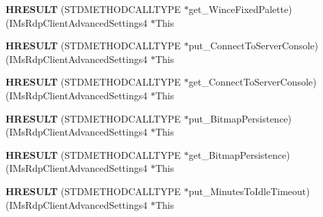 \begin{DoxyCompactItemize}
\item 
\mbox{\label{struct_i_ms_rdp_client_advanced_settings4_vtbl_a818f23851d80ab36a2fda9d3d24af6fb}} 
{\bfseries H\+R\+E\+S\+U\+LT} (S\+T\+D\+M\+E\+T\+H\+O\+D\+C\+A\+L\+L\+T\+Y\+PE $\ast$get\+\_\+\+Wince\+Fixed\+Palette)(I\+Ms\+Rdp\+Client\+Advanced\+Settings4 $\ast$This
\item 
\mbox{\label{struct_i_ms_rdp_client_advanced_settings4_vtbl_a9392369f69540c52bb2cd31fb18f594a}} 
{\bfseries H\+R\+E\+S\+U\+LT} (S\+T\+D\+M\+E\+T\+H\+O\+D\+C\+A\+L\+L\+T\+Y\+PE $\ast$put\+\_\+\+Connect\+To\+Server\+Console)(I\+Ms\+Rdp\+Client\+Advanced\+Settings4 $\ast$This
\item 
\mbox{\label{struct_i_ms_rdp_client_advanced_settings4_vtbl_a012210ca313380c65e2003edcac952ab}} 
{\bfseries H\+R\+E\+S\+U\+LT} (S\+T\+D\+M\+E\+T\+H\+O\+D\+C\+A\+L\+L\+T\+Y\+PE $\ast$get\+\_\+\+Connect\+To\+Server\+Console)(I\+Ms\+Rdp\+Client\+Advanced\+Settings4 $\ast$This
\item 
\mbox{\label{struct_i_ms_rdp_client_advanced_settings4_vtbl_ae551bbf0d75a48f38f5c7597bd5a4003}} 
{\bfseries H\+R\+E\+S\+U\+LT} (S\+T\+D\+M\+E\+T\+H\+O\+D\+C\+A\+L\+L\+T\+Y\+PE $\ast$put\+\_\+\+Bitmap\+Persistence)(I\+Ms\+Rdp\+Client\+Advanced\+Settings4 $\ast$This
\item 
\mbox{\label{struct_i_ms_rdp_client_advanced_settings4_vtbl_a25a671a4c714e3bd5950927d4312e0c9}} 
{\bfseries H\+R\+E\+S\+U\+LT} (S\+T\+D\+M\+E\+T\+H\+O\+D\+C\+A\+L\+L\+T\+Y\+PE $\ast$get\+\_\+\+Bitmap\+Persistence)(I\+Ms\+Rdp\+Client\+Advanced\+Settings4 $\ast$This
\item 
\mbox{\label{struct_i_ms_rdp_client_advanced_settings4_vtbl_ad7860255034514b65fc28557560e6146}} 
{\bfseries H\+R\+E\+S\+U\+LT} (S\+T\+D\+M\+E\+T\+H\+O\+D\+C\+A\+L\+L\+T\+Y\+PE $\ast$put\+\_\+\+Minutes\+To\+Idle\+Timeout)(I\+Ms\+Rdp\+Client\+Advanced\+Settings4 $\ast$This
\item 
\mbox{\label{struct_i_ms_rdp_client_advanced_settings4_vtbl_a3bb8f57a95680ce7170dc238491932b9}} 

\end{DoxyCompactItemize}
